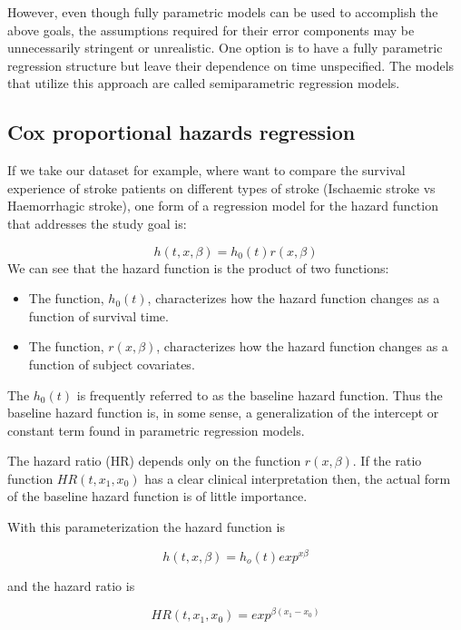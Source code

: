 \documentclass[
  10pt,
]{krantz}
\providecommand{\tightlist}{%
  \setlength{\itemsep}{0pt}\setlength{\parskip}{0pt}}
\begin{document}
However, even though fully parametric models can be used to accomplish the above goals, the assumptions required for their error components may be unnecessarily stringent or unrealistic. One option is to have a fully parametric regression structure but leave their dependence on time unspecified. The models that utilize this approach are called semiparametric regression models.

\hypertarget{cox-proportional-hazards-regression}{%
\subsection{\texorpdfstring{Cox proportional hazards regression}{Cox proportional hazards regression}}\label{cox-proportional-hazards-regression}}

If we take our dataset for example, where want to compare the survival experience of stroke patients on different types of stroke (Ischaemic stroke vs Haemorrhagic stroke), one form of a regression model for the hazard function that addresses the study goal is:

\[h(t,x,\beta) = h_0(t)r(x,\beta)\]
We can see that the hazard function is the product of two functions:

\begin{itemize}
\tightlist
\item
  The function, \(h_0(t)\), characterizes how the hazard function changes as a function of survival time.
\item
  The function, \(r(x,\beta)\), characterizes how the hazard function changes as a function of subject covariates.
\end{itemize}

The \(h_0(t)\) is frequently referred to as the baseline hazard function. Thus the baseline hazard function is, in some sense, a generalization of the intercept or constant term found in parametric regression models.

The hazard ratio (HR) depends only on the function \(r(x,\beta)\). If the ratio function \(HR(t,x_1,x_0)\) has a clear clinical interpretation then, the actual form of the baseline hazard function is of little importance.

With this parameterization the hazard function is

\[h(t,x,\beta) = h_o(t)exp^{x \beta}\]

and the hazard ratio is

\[HR(t,x_1, x_0) = exp^{\beta(x_1 - x_0)}\]
\end{document}
